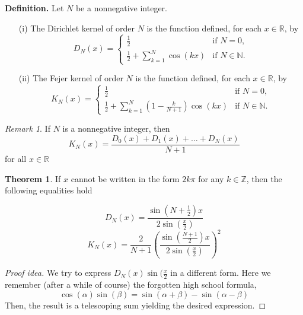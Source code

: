 \documentclass{article}
\theoremstyle{remark}
\newtheorem*{remark}{Remark}
\theoremstyle{lemma}
\theoremstyle{example}
\theoremstyle{proofTrial}
\theoremstyle{definition}
\newtheorem{theorem}{Theorem}
\begin{document}
\textbf{Definition.} Let $N$ be a nonnegative integer.
\begin{enumerate}
  \item[(i)] The Dirichlet kernel of order $N$ is the function defined, for each $x \in \mathbb{R}$, by
  \[
  D_N(x) = \begin{cases}
            \frac{1}{2} & \text{if } N = 0, \\
            \frac{1}{2}  + \sum_{k=1}^{N} \cos(kx) & \text{if } N \in \mathbb{N}.
           \end{cases}
  \]

  \item[(ii)] The Fejer kernel of order $N$ is the function defined, for each $x \in \mathbb{R}$, by
  \[
  K_N(x) = \begin{cases}
            \frac{1}{2} & \text{if } N = 0, \\
            \frac{1}{2} + \sum_{k=1}^{N}\left( 1 - \frac{k}{N + 1} \right)\cos(kx) & \text{if } N \in \mathbb{N}.
           \end{cases}
  \]
\end{enumerate}

\begin{remark}
    If $N$ is a nonnegative integer, then
\[
K_N(x) = \frac{D_0(x) + D_1(x) + \dots + D_N(x)}{N+1}
\]
for all $x \in \mathbb{R}$
\end{remark}

\begin{theorem}
    If $x$ cannot be written in the form $2k\pi$ for any $k \in \mathbb{Z}$, then the following equalities hold

    \[
    D_N(x) = \frac{\sin(N + \frac{1}{2})x}{2\sin(\frac{x}{2})}
    \]
    \[
    K_N(x) = \frac{2}{N+1}(\frac{\sin(\frac{N + 1}{2})x}{2\sin(\frac{x}{2})})^2
    \]
\end{theorem}
\begin{proof}[Proof idea] We try to express  $D_N(x)\sin(\frac{x}{2}$ in a different form. Here we remember (after a while of course) the forgotten high school formula,
\[
\cos(\alpha)\sin(\beta) = \sin(\alpha + \beta) - \sin(\alpha - \beta)
\]
    Then, the result is a telescoping sum yielding the desired expression.
\end{proof}
\end{document}
